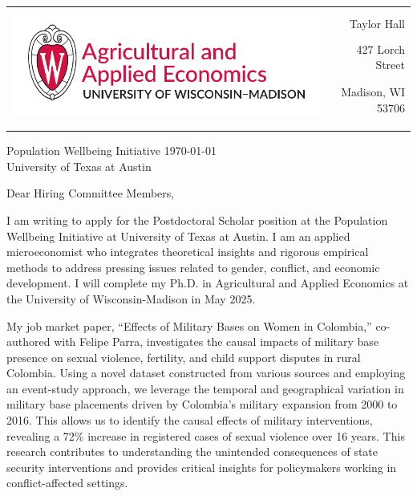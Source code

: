 \documentclass[12pt]{letter}
\begin{document}
\begin{tabularx}{\textwidth}{Xr}
\multirow{4}{*}{\includegraphics[height=3\baselineskip]{logo_cropped.pdf}} &  \\
& Taylor Hall \\
& 427 Lorch Street \\
& Madison, WI 53706 \\
[-1.8ex]\\
\\
\end{tabularx}

Population Wellbeing Initiative \hfill \today \\
University of Texas at Austin

\medskip

Dear Hiring Committee Members,

I am writing to apply for the Postdoctoral Scholar position at the Population Wellbeing Initiative at University of Texas at Austin. 
I am an applied microeconomist who integrates theoretical insights and rigorous empirical methods to address pressing issues related to gender, conflict, and economic development.
I will complete my Ph.D. in Agricultural and Applied Economics at the University of Wisconsin-Madison in May 2025. 

My job market paper, “Effects of Military Bases on Women in Colombia,” co-authored with Felipe Parra, investigates the causal impacts of military base presence 
on sexual violence, fertility, and child support disputes in rural Colombia. Using a novel dataset constructed from various sources and employing an event-study approach, 
we leverage the temporal and geographical variation in military base placements driven by Colombia's military expansion from 2000 to 2016. This allows us to identify 
the causal effects of military interventions, revealing a 72\% increase in registered cases of sexual violence over 16 years. 
This research contributes to understanding the unintended consequences of state security interventions and provides critical insights 
for policymakers working in conflict-affected settings.
\end{document}
